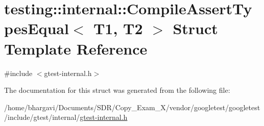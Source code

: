 \hypertarget{structtesting_1_1internal_1_1_compile_assert_types_equal}{}\section{testing\+:\+:internal\+:\+:Compile\+Assert\+Types\+Equal$<$ T1, T2 $>$ Struct Template Reference}
\label{structtesting_1_1internal_1_1_compile_assert_types_equal}


{\ttfamily \#include $<$gtest-\/internal.\+h$>$}



The documentation for this struct was generated from the following file\+:\begin{DoxyCompactItemize}
\item 
/home/bhargavi/\+Documents/\+S\+D\+R/\+Copy\+\_\+\+Exam\+\_\+X/vendor/googletest/googletest/include/gtest/internal/\hyperlink{gtest-internal_8h}{gtest-\/internal.\+h}\end{DoxyCompactItemize}
